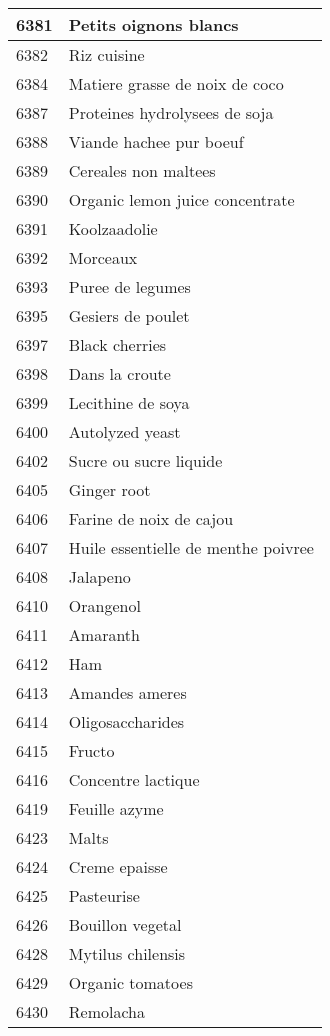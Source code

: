 \begin{longtable}{|l|l|}
6381 & Petits oignons blancs \\ \hline 
6382 & Riz cuisine \\ \hline 
6384 & Matiere grasse de noix de coco \\ \hline 
6387 & Proteines hydrolysees de soja \\ \hline 
6388 & Viande hachee pur boeuf \\ \hline 
6389 & Cereales non maltees \\ \hline 
6390 & Organic lemon juice concentrate \\ \hline 
6391 & Koolzaadolie \\ \hline 
6392 & Morceaux \\ \hline 
6393 & Puree de legumes \\ \hline 
6395 & Gesiers de poulet \\ \hline 
6397 & Black cherries \\ \hline 
6398 & Dans la croute \\ \hline 
6399 & Lecithine de soya \\ \hline 
6400 & Autolyzed yeast \\ \hline 
6402 & Sucre ou sucre liquide \\ \hline 
6405 & Ginger root \\ \hline 
6406 & Farine de noix de cajou \\ \hline 
6407 & Huile essentielle de menthe poivree \\ \hline 
6408 & Jalapeno \\ \hline 
6410 & Orangenol \\ \hline 
6411 & Amaranth \\ \hline 
6412 & Ham \\ \hline 
6413 & Amandes ameres \\ \hline 
6414 & Oligosaccharides \\ \hline 
6415 & Fructo \\ \hline 
6416 & Concentre lactique \\ \hline 
6419 & Feuille azyme \\ \hline 
6423 & Malts \\ \hline 
6424 & Creme epaisse \\ \hline 
6425 & Pasteurise \\ \hline 
6426 & Bouillon vegetal \\ \hline 
6428 & Mytilus chilensis \\ \hline 
6429 & Organic tomatoes \\ \hline 
6430 & Remolacha \\ \hline 

\end{longtable}
